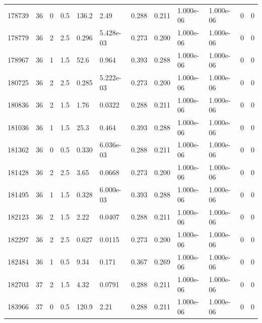 \documentclass[preview]{standalone}
\begin{document}
{{{{{{{{\begin{tabular}{L{1.2cm}C{1.2cm} C{0.3cm}C{0.5cm} C{1.4cm}C{1.4cm} C{1.4cm}C{1.4cm} C{1.6cm}C{1.6cm} C{1.6cm}C{1.6cm}}
  178739  &    36  & 0     & 0.5 &  136.2  & 2.49  &  0.288&   0.211& 1.000e-06 & 1.000e-06   &  0 & 0  \\ 
  178779  &    36  & 2     & 2.5 &  0.296  & 5.428e-03  &  0.273&   0.200& 1.000e-06 & 1.000e-06   &  0 & 0  \\ 
  178967  &    36  & 1     & 1.5 &  52.6  & 0.964  &  0.393&   0.288& 1.000e-06 & 1.000e-06   &  0 & 0  \\ 
  180725  &    36  & 2     & 2.5 &  0.285  & 5.222e-03  &  0.273&   0.200& 1.000e-06 & 1.000e-06   &  0 & 0  \\ 
  180836  &    36  & 2     & 1.5 &  1.76  & 0.0322  &  0.288&   0.211& 1.000e-06 & 1.000e-06   &  0 & 0  \\ 
  181036  &    36  & 1     & 1.5 &  25.3  & 0.464  &  0.393&   0.288& 1.000e-06 & 1.000e-06   &  0 & 0  \\ 
  181362  &    36  & 0     & 0.5 &  0.330  & 6.036e-03  &  0.288&   0.211& 1.000e-06 & 1.000e-06   &  0 & 0  \\ 
  181428  &    36  & 2     & 2.5 &  3.65  & 0.0668  &  0.273&   0.200& 1.000e-06 & 1.000e-06   &  0 & 0  \\ 
  181495  &    36  & 1     & 1.5 &  0.328  & 6.000e-03  &  0.393&   0.288& 1.000e-06 & 1.000e-06   &  0 & 0  \\ 
  182123  &    36  & 2     & 1.5 &  2.22  & 0.0407  &  0.288&   0.211& 1.000e-06 & 1.000e-06   &  0 & 0  \\ 
  182297  &    36  & 2     & 2.5 &  0.627  & 0.0115  &  0.273&   0.200& 1.000e-06 & 1.000e-06   &  0 & 0  \\ 
  182484  &    36  & 1     & 0.5 &  9.34  & 0.171  &  0.367&   0.269& 1.000e-06 & 1.000e-06   &  0 & 0  \\ 
  182703  &    37  & 2     & 1.5 &  4.32  & 0.0791  &  0.288&   0.211& 1.000e-06 & 1.000e-06   &  0 & 0  \\ 
  183966  &    37  & 0     & 0.5 &  120.9  & 2.21  &  0.288&   0.211& 1.000e-06 & 1.000e-06   &  0 & 0  \\ 
\hline 
\end{tabular} 

}}}}}}}}
\end{document}
